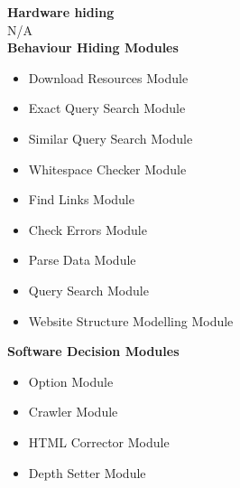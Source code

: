 \documentclass[titlepage]{article}
\begin{document}
\textbf{Hardware hiding}\\

N/A\\

\textbf{Behaviour Hiding Modules}

\begin{itemize}
\item{Download Resources Module}\\
\item{Exact Query Search Module}\\
\item{Similar Query Search Module}\\
\item{Whitespace Checker Module}\\
\item{Find Links Module}\\
\item{Check Errors Module}\\
\item{Parse Data Module}\\
\item{Query Search Module}\\
\item{Website Structure Modelling Module}\\
\end{itemize}

\textbf{Software Decision Modules}

\begin{itemize}
\item{Option Module}\\
\item{Crawler Module}\\
\item{HTML Corrector Module}\\
\item{Depth Setter Module}\\
\end{itemize}
\end{document}
